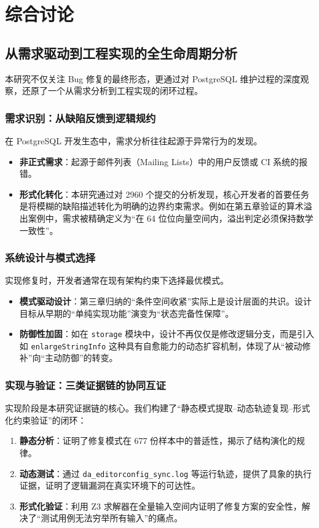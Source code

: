 \chapter{综合讨论}\label{chap:discussion}

\section{从需求驱动到工程实现的全生命周期分析}

本研究不仅关注 Bug 修复的最终形态，更通过对 PostgreSQL 维护过程的深度观察，还原了一个从需求分析到工程实现的闭环过程。

\subsection{需求识别：从缺陷反馈到逻辑规约}
在 PostgreSQL 开发生态中，需求分析往往起源于异常行为的发现。
\begin{itemize}
    \item \textbf{非正式需求}：起源于邮件列表（Mailing Lists）中的用户反馈或 CI 系统的报错。
    \item \textbf{形式化转化}：本研究通过对 2960 个提交的分析发现，核心开发者的首要任务是将模糊的缺陷描述转化为明确的边界约束需求。例如在第五章验证的算术溢出案例中，需求被精确定义为“在 64 位位向量空间内，溢出判定必须保持数学一致性”。
\end{itemize}

\subsection{系统设计与模式选择}
实现修复时，开发者通常在现有架构约束下选择最优模式。
\begin{itemize}
    \item \textbf{模式驱动设计}：第三章归纳的“条件空间收紧”实际上是设计层面的共识。设计目标从早期的“单纯实现功能”演变为“状态完备性保障”。
    \item \textbf{防御性加固}：如在 \texttt{storage} 模块中，设计不再仅仅是修改逻辑分支，而是引入如 \texttt{enlargeStringInfo} 这种具有自愈能力的动态扩容机制，体现了从“被动修补”向“主动防御”的转变。
\end{itemize}

\subsection{实现与验证：三类证据链的协同互证}
实现阶段是本研究证据链的核心。我们构建了“静态模式提取--动态轨迹复现--形式化约束验证”的闭环：
\begin{enumerate}
    \item \textbf{静态分析}：证明了修复模式在 677 份样本中的普适性，揭示了结构演化的规律。
    \item \textbf{动态测试}：通过 \texttt{da\_editorconfig\_sync.log} 等运行轨迹，提供了具象的执行证据，证明了逻辑漏洞在真实环境下的可达性。
    \item \textbf{形式化验证}：利用 Z3 求解器在全量输入空间内证明了修复方案的安全性，解决了“测试用例无法穷举所有输入”的痛点。
\end{enumerate}

